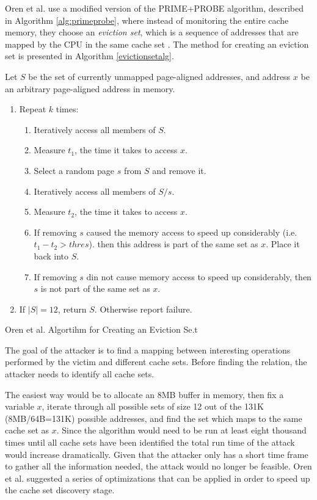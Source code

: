 \documentclass[10pt,a4paper,twoside]{book}
\begin{document}
Oren et al. use a modified version of the PRIME+PROBE algorithm, described in Algorithm \ref{alg:primeprobe}, where instead of monitoring the entire cache memory, they choose an \textit{eviction set}, which is a sequence of addresses that are mapped by the CPU in the same cache set \cite{oren2015spy}. The method for creating an eviction set is presented in Algorithm \ref{evictionsetalg}.

\begin{algorithm}
Let $S$ be the set of currently unmapped page-aligned addresses, and address $x$ be an arbitrary page-aligned address in memory.
\begin{enumerate}
\item Repeat $k$ times:
\begin{enumerate}
\item Iteratively access all members of $S$.
\item Measure $t_1$, the time it takes to access $x$.
\item Select a random page $s$ from $S$ and remove it.
\item Iteratively access all members of $S/s$.
\item Measure $t_2$, the time it takes to access $x$.
\item If removing $s$ caused the memory access to speed up considerably (i.e. $t_1 - t_2 > thres$). then this address is part of the same set as $x$. Place it back into $S$.
\item If removing $s$ din not cause memory access to speed up considerably, then $s$ is not part of the same set as $x$.
\end{enumerate}
\item If $|S| = 12$, return $S$. Otherwise report failure.
\end{enumerate}
\caption{Oren et al. Algortihm for Creating an Eviction Se.t}
\label{evictionsetalg}
\end{algorithm}

The goal of the attacker is to find a mapping between interesting operations performed by the victim and different cache sets. Before finding the relation, the attacker needs to identify all cache sets.


The easiest way would be to allocate an 8MB buffer in memory, then fix a variable $x$, iterate through all possible sets of size 12 out of the 131K (8MB/64B=131K) possible addresses, and find the set which maps to the same cache set as $x$. Since the algorithm would need to be run at least eight thousand times until all cache sets have been identified the total run time of the attack would increase dramatically. Given that the attacker only has a short time frame to gather all the information needed, the attack would no longer be feasible. Oren et al. suggested a series of optimizations that can be applied in order to speed up the cache set discovery stage. 
\end{document}
